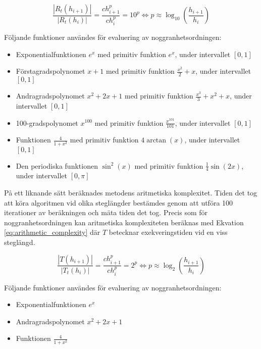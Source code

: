 \documentclass[a4paper,titlepage]{article}
\begin{document}
\begin{equation}
    \label{eq:orderofaccuracy}
    \frac{| R_t(h_{i+1})|}{| R_t(h_{i})|}  = \frac{ch_{i+1}^p}{ch_{i}^p} = 10^p
    \Leftrightarrow p \approx \log_{10}\left( \frac{h_{i+1}}{h_i} \right)
\end{equation}

Följande funktioner användes för evaluering av noggranhetsordningen:

\begin{itemize}
    \item Exponentialfunktionen $e^x$ med primitiv funktion $e^x$, under intervallet $[0, 1]$
    \item Förstagradspolynomet $x + 1$ med primitiv funktion $\frac{x^2}{2} + x$, under intervallet $[0, 1]$
    \item Andragradspolynomet $x^2 + 2x + 1$ med primitiv funktion
        $\frac{x^3}{3} + x^2 + x$, under intervallet $[0, 1]$
    \item 100-gradspolynomet $x^{100}$ med primitiv funktion
        $\frac{x^{101}}{101}$, under intervallet $[0, 1]$
    \item Funktionen $\frac{4}{1 + x^2}$ med primitiv funktion $4\arctan(x)$, under intervallet $[0, 1]$
    \item Den periodiska funktionen $\sin^2(x)$ med primitiv funktion
        $\frac{1}{4}\sin(2x)$, under intervallet $[0, \pi]$
\end{itemize}


På ett liknande sätt beräknades metodens aritmetiska komplexitet. Tiden det tog att köra
algoritmen vid olika steglängder bestämdes genom att utföra 100 iterationer av beräkningen
och mäta tiden det tog. Precis som för noggranhetsordningen kan aritmetiska komplexiteten
beräknas med Ekvation \ref{eq:arithmetic_complexity} där $T$ betecknar exekveringstiden
vid en viss steglängd.

\begin{equation}
    \label{eq:arithmetic_complexity}
    \frac{| T(h_{i+1})|}{| T_t(h_{i})|}  = \frac{ch_{i+1}^p}{ch_{i}^p} = 2^p
    \Leftrightarrow p \approx \log_{2}\left( \frac{h_{i+1}}{h_i} \right)
\end{equation}

Följande funktioner användes för evaluering av noggranhetsordningen:

\begin{itemize}
    \item Exponentialfunktionen $e^x$
    \item Andragradspolynomet $x^2 + 2x + 1$
    \item Funktionen $\frac{4}{1 + x^2}$
\end{itemize}
\end{document}
